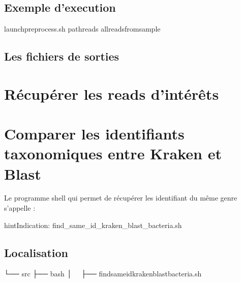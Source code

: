 \documentclass[letterpaper,10pt,french]{sphinxmanual}
\begin{document}
\subsection{Exemple d’execution}
\label{\detokenize{bash/launch_preprocess.sh:exemple-d-execution}}
\begin{sphinxVerbatim}[commandchars=\\\{\}]
launch\PYGZus{}preprocess.sh \PYGZhy{}path\PYGZus{}reads all\PYGZus{}reads\PYGZus{}from\PYGZus{}sample
\end{sphinxVerbatim}


\subsection{Les fichiers de sorties}
\label{\detokenize{bash/launch_preprocess.sh:les-fichiers-de-sorties}}

\section{Récupérer les reads d’intérêts}
\label{\detokenize{bash/recover_reads.sh:recuperer-les-reads-d-interets}}\label{\detokenize{bash/recover_reads.sh::doc}}

\section{Comparer les identifiants taxonomiques entre Kraken et Blast}
\label{\detokenize{bash/find_same_id_kraken_blast_bacteria.sh:comparer-les-identifiants-taxonomiques-entre-kraken-et-blast}}\label{\detokenize{bash/find_same_id_kraken_blast_bacteria.sh::doc}}
Le programme shell qui permet de récupérer les identifiant du même genre s’appelle :

\begin{sphinxadmonition}{hint}{Indication:}
find\_same\_id\_kraken\_blast\_bacteria.sh
\end{sphinxadmonition}


\subsection{Localisation}
\label{\detokenize{bash/find_same_id_kraken_blast_bacteria.sh:localisation}}
\begin{sphinxVerbatim}[commandchars=\\\{\}]
└── src
 ├── bash
 │   ├── find\PYGZus{}same\PYGZus{}id\PYGZus{}kraken\PYGZus{}blast\PYGZus{}bacteria.sh
\end{sphinxVerbatim}
\end{document}
